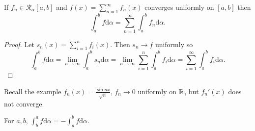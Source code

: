 \begin{corollary*}
	If $f_{n} \in \mathscr{R}_{\alpha}[a,b]$ and $f(x)=\sum_{n=1}^{\infty}{f_{n}(x)}$ converges uniformly on $[a,b]$ then \[
		\int_{a}^{b}{f\mathrm{d}\alpha}=\sum_{n=1}^{\infty}{\int_{a}^{b}{f_{n}\mathrm{d}\alpha}}
		.\]
	\begin{proof}
		Let $s_{n}(x)=\sum_{i=1}^{n}{f_{i}(x)}$. Then $s_{n}\to f$ uniformly so \[
			\int_{a}^{b}{f\mathrm{d}\alpha}=\lim_{n\to \infty}{\int_{a}^{b}{s_{n}\mathrm{d}\alpha}}=\lim_{n\to \infty}{\sum_{i=1}^{n}{\int_{a}^{b}{f_{i}\mathrm{d}\alpha}}}=\sum_{i=1}^{\infty}{\int_{a}^{b}{f_{i}\mathrm{d}\alpha}}
			.\]
	\end{proof}
	\begin{note}
		Recall the example $f_{n}(x)=\frac{\sin{nx}}{\sqrt{n}}$, $f_{n}\to 0$ uniformly on $\mathbb{R}$, but $f_{n}'(x)$ does not converge.
	\end{note}
\end{corollary*}
\begin{notation}
	For $a,b$, $\int_{b}^{a}{f\mathrm{d}\alpha}=-\int_{a}^{b}{f\mathrm{d}\alpha}$.
\end{notation}
